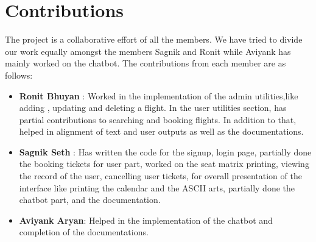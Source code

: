 \documentclass[a4paper]{scrartcl}
\begin{document}
\section{Contributions}
The project is a collaborative effort of all the members. We have tried to divide our work equally amongst the members Sagnik and Ronit while Aviyank has mainly worked on the chatbot. 
The contributions from each member are as follows:

\begin{itemize}

    \item \textbf{Ronit Bhuyan} : Worked in the implementation of the admin utilities,like adding , updating and deleting a flight. In the user utilities section, has partial contributions to searching and booking flights. In addition to that, helped in alignment of text and user outputs as well as the documentations.
    
    \item \textbf{Sagnik Seth} : Has written the code for the signup, login page, partially done the booking tickets for user part, worked on the seat matrix printing, viewing the record of the user, cancelling user tickets, for overall presentation of the interface like printing the calendar and the ASCII arts, partially done the chatbot part, and the documentation.
    
    
    
    \item \textbf{Aviyank Aryan}: Helped in the implementation of the chatbot and  completion of the documentations.
\end{itemize}
\end{document}
